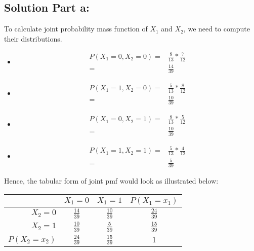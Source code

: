 \documentclass[12pt]{article}%
\begin{document}
\subsection*{Solution Part a:}
To calculate joint probability mass function of $X_1$ and $X_2$, we need to compute their distributions.
\begin{itemize}
\item 
\begin{fleqn}[\parindent]
\begin{equation*}
\begin{split}
P(X_1 = 0, X_2 = 0) = & \frac{8}{13}*\frac{7}{12}\\
					= & \frac{14}{39}
\end{split}
\end{equation*}
\end{fleqn}
\item 
\begin{fleqn}[\parindent]
\begin{equation*}
\begin{split}
P(X_1 = 1, X_2 = 0) = & \frac{5}{13}*\frac{8}{12}\\
					= & \frac{10}{39}
\end{split}
\end{equation*}
\end{fleqn}
\item 
\begin{fleqn}[\parindent]
\begin{equation*}
\begin{split}
P(X_1 = 0, X_2 = 1) = & \frac{8}{13}*\frac{5}{12}\\
					= & \frac{10}{39}
\end{split}
\end{equation*}
\end{fleqn}
\item 
\begin{fleqn}[\parindent]
\begin{equation*}
\begin{split}
P(X_1 = 1, X_2 = 1) = & \frac{5}{13}*\frac{4}{12}\\
					= & \frac{5}{39}
\end{split}
\end{equation*}
\end{fleqn}
\end{itemize}
Hence, the tabular form of joint pmf would look as illustrated below: \\
\renewcommand{\arraystretch}{2}
\begin{center}
\begin{tabular}[5pt]{| r | c | c | c |}
\hline
 & $X_1 = 0$ & $X_1 = 1$ & $P(X_1 = x_1)$ \\
\hline
$X_2 = 0$ & $\frac{14}{39}$ & $\frac{10}{39}$ & $\frac{24}{39}$\\
\hline 
$X_2 = 1$ & $\frac{10}{39}$ & $\frac{5}{39}$ & $\frac{15}{39}$\\
\hline
$P(X_2 = x_2)$ & $\frac{24}{39}$ & $\frac{15}{39}$ & $1$ \\
\hline 
\end{tabular}
\end{center}
\renewcommand{\arraystretch}{1}
\end{document}

